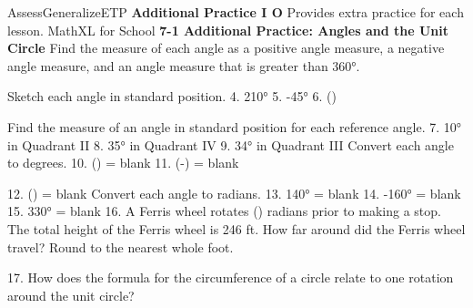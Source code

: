 \documentclass{article}
\newenvironment{te-addendum}[2]{}{}     %
\newcommand{\answer}[1]{}               %
\newcommand{\placeholder}[2]{}          %
\newcommand{\te}[1]{}                   %
\begin{document}
\begin{te-addendum}{Assess}{GeneralizeETP}
\textbf{Additional Practice I O}
Provides extra practice for each lesson.
MathXL for School
\textbf{7-1 Additional Practice: Angles and the Unit Circle}
Find the measure of each angle as a positive angle measure, a negative angle measure, and an angle measure that is greater than 360°.
\placeholder{graph}{Three black arrowed x,y axes centered at O without ticks.1 terminal ray IV60° clockwise from positive x with60°label;2 ray II60° above negative x with60°label and counterclockwise arc;3 ray IV45° below positive x with45°label and counterclockwise major arc. Initial rays positive x.}
\answer{1. 300°, -60°, 660°; 2. 120°, -240°, 480°; 3. 315°, -45°, 675°.}
Sketch each angle in standard position.
4. 210°
5. -45°
6. ()
\answer{4--6. See graphs.}
\placeholder{graph}{Three black arrowed x,y axes, no ticks, magenta initial rays on positive x and terminal rays respectively210° in III,-45° in IV,5pi/6 in II. Magenta angle labels210°,-45°,5pi/6 and O at origin. Counterclockwise arcs on4,6; clockwise on5.}
Find the measure of an angle in standard position for each reference angle.
7. 10° in Quadrant II \answer{170°}
8. 35° in Quadrant IV \answer{325°}
9. 34° in Quadrant III \answer{214°}
Convert each angle to degrees.
10. () = blank \answer{270°}
11. (-) = blank \answer{144°}
\te{Printed answer144°; likely-144° for the printed negative angle.}
12. () = blank \answer{315°}
Convert each angle to radians.
13. 140° = blank \answer{(\frac{7\pi}{9})}
14. -160° = blank \answer{(-\frac{8\pi}{9})}
15. 330° = blank \answer{(\frac{11\pi}{6})}
16. A Ferris wheel rotates () radians prior to making a stop. The total height of the Ferris wheel is 246 ft. How far around did the Ferris wheel travel? Round to the nearest whole foot.
\answer{435 ft}
17. How does the formula for the circumference of a circle relate to one rotation around the unit circle?
\answer{You multiply the radius of a circle by (2\pi) to find its circumference. One rotation around the unit circle is (2\pi) radians.}
\end{te-addendum}
\end{document}
